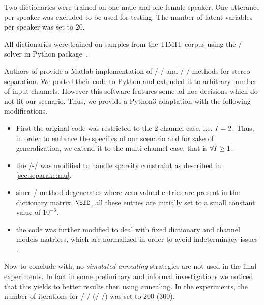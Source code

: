 Two dictionaries were trained on one male and one female speaker.
One utterance per speaker was excluded to be used for testing.
The number of latent variables per speaker was set to $20$.

\mynewline
All dictionaries were trained on samples from the TIMIT corpus  using the \NMF/ solver in  Python package~.

 Authors of  provide a Matlab implementation of \MU/-\NMF/ and \EM/-\NMF/ methods for stereo separation.
We ported their code to Python and extended it to arbitrary number of input channels.
However this software features some ad-hoc decisions which do not fit our scenario.
Thus, we provide a Python3 adaptation with the following modifications.
\begin{itemize}
    \item First the original code was restricted to the 2-channel case, i.e.  $I = 2$.
    Thus, in order to embrace the specifics of our scenario and for sake of generalization, we extend it to the multi-channel case, that is $\forall I \geq 1$.
    \item the \MU/-\NMF/ was modified to handle sparsity constraint as described in \ref{sec:separake:mu}.
    \item since \EM/ method degenerates where zero-valued entries are present in the dictionary matrix, $\mD$, all these entries are initially set to a small constant value of $10^{-6}$.
    \item the code was further modified to deal with fixed dictionary and channel models matrices, which are normalized in order to avoid indeterminacy issues .
\end{itemize}
Now to conclude with, no \textit{simulated annealing} strategies are not used in the final experiments.
In fact in some preliminary and informal investigations we noticed that this yields to better results then using annealing.
In the experiments, the number of iterations for \MU/-\NMF/ (\EM/-\NMF/) was set to $200$ ($300$).

